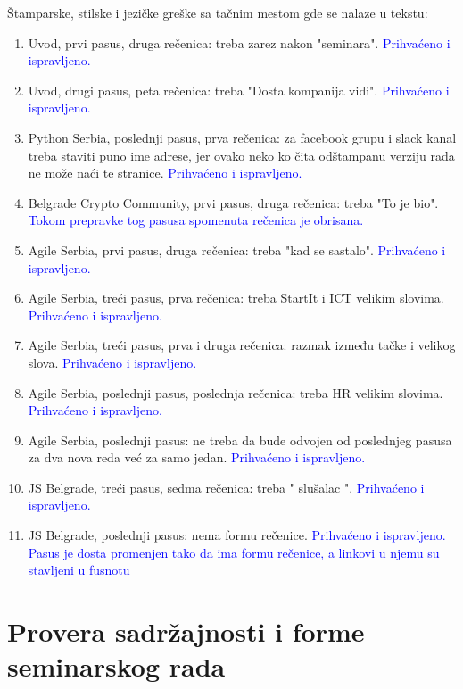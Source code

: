 \documentclass[a4paper]{report}
\newcommand{\odgovor}[1]{\textcolor{blue}{#1}}
\begin{document}
Štamparske, stilske i jezičke greške sa tačnim mestom gde se nalaze u tekstu:
\begin{enumerate}
\item Uvod, prvi pasus, druga rečenica: treba zarez nakon "{seminara}".
\odgovor{Prihvaćeno i ispravljeno.}
\item Uvod, drugi pasus, peta rečenica: treba "{Dosta kompanija vidi}".
\odgovor{Prihvaćeno i ispravljeno.}
\item Python Serbia, poslednji pasus, prva rečenica: za facebook grupu i slack kanal treba staviti puno ime adrese, jer ovako neko ko čita odštampanu verziju rada ne može naći te stranice.
\odgovor{Prihvaćeno i ispravljeno.}
\item Belgrade Crypto Community, prvi pasus, druga rečenica: treba "To je bio".
\odgovor{Tokom prepravke tog pasusa spomenuta rečenica je obrisana.}
\item Agile Serbia, prvi pasus, druga rečenica: treba "kad se sastalo".
\odgovor{Prihvaćeno i ispravljeno.}
\item Agile Serbia, treći pasus, prva rečenica: treba StartIt i ICT velikim slovima.
\odgovor{Prihvaćeno i ispravljeno.}
\item Agile Serbia, treći pasus, prva i druga rečenica: razmak između tačke i velikog slova.
\odgovor{Prihvaćeno i ispravljeno.}
\item Agile Serbia, poslednji pasus, poslednja rečenica: treba HR velikim slovima.
\odgovor{Prihvaćeno i ispravljeno.}
\item Agile Serbia, poslednji pasus: ne treba da bude odvojen od poslednjeg pasusa za dva nova reda već za samo jedan.
\odgovor{Prihvaćeno i ispravljeno.}
\item JS Belgrade, treći pasus, sedma rečenica: treba " slušalac ".
\odgovor{Prihvaćeno i ispravljeno.}
\item JS Belgrade, poslednji pasus: nema formu rečenice.
\odgovor{Prihvaćeno i ispravljeno. Pasus je dosta promenjen tako da ima formu rečenice, a linkovi u njemu su stavljeni u fusnotu}
\end{enumerate}


\section{Provera sadržajnosti i forme seminarskog rada}
\end{document}
